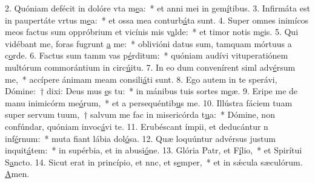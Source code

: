 2. Quóniam defécit in dolóre vta m\uline{e}a:~* et anni mei in gem\uline{í}tibus.
3. Infirmáta est in paupertáte vrtus m\uline{e}a:~* et ossa mea conturb\uline{á}ta sunt.
4. Super omnes inimícos meos factus sum oppróbrium et vicínis mis v\uline{a}lde:~* et timor notis m\uline{e}is.
5. Qui vidébant me, foras fugrunt \uline{a} me:~* oblivióni datus sum, tamquam mórtuus a c\uline{o}rde.
6. Factus sum tamm vas p\uline{é}rditum:~* quóniam audívi vituperatiónem multórum commorántium in circ\uline{ú}itu.
7. In eo dum convenírent siml adv\uline{é}rsum me,~* accípere ánimam meam consili\uline{á}ti sunt.
8. Ego autem in te sperávi, Dómine:~† dixi: Deus mus \uline{e}s tu:~* in mánibus tuis sortes m\uline{e}æ.
9. Eripe me de manu inimicórm me\uline{ó}rum,~* et a persequéntib\uline{u}s me.
10. Illústra fáciem tuam super servum tuum,~† salvum me fac in misericórda t\uline{u}a:~* Dómine, non confúndar, quóniam invoc\uline{á}vi te.
11. Erubéscant ímpii, et deducántur n inf\uline{é}rnum:~* muta fiant lábia dol\uline{ó}sa.
12. Quæ loquúntur advérsus justum inquit\uline{á}tem:~* in supérbia, et in abusi\uline{ó}ne.
13. Glória Patr, et F\uline{í}lio,~* et Spirítui S\uline{a}ncto.
14. Sicut erat in princípio, et nnc, et s\uline{e}mper,~* et in sǽcula sæculórum. \uline{A}men.
